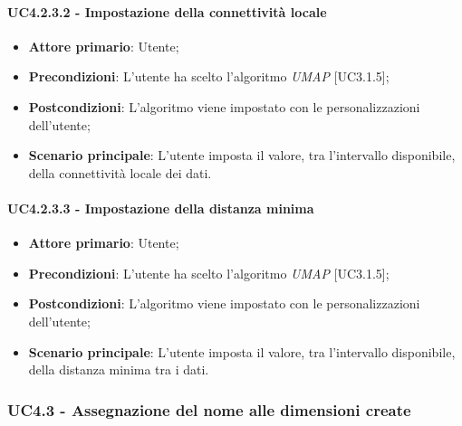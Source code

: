 \paragraph{UC4.2.3.2 - Impostazione della connettività locale}
\begin{itemize}
	\item \textbf{Attore primario}: Utente;
	
	\item \textbf{Precondizioni}: L'utente ha scelto l'algoritmo \textit{UMAP} [UC3.1.5];
	
	\item \textbf{Postcondizioni}: L'algoritmo viene impostato con le personalizzazioni dell'utente;
	
	\item \textbf{Scenario principale}: L'utente imposta il valore, tra l'intervallo disponibile, della connettività locale dei dati.

\end{itemize}

\paragraph{UC4.2.3.3 - Impostazione della distanza minima}
\begin{itemize}
	\item \textbf{Attore primario}: Utente;
	
	\item \textbf{Precondizioni}: L'utente ha scelto l'algoritmo \textit{UMAP} [UC3.1.5];
	
	\item \textbf{Postcondizioni}: L'algoritmo viene impostato con le personalizzazioni dell'utente;
	
	\item \textbf{Scenario principale}: L'utente imposta il valore, tra l'intervallo disponibile, della distanza minima tra i dati.

\end{itemize}

\subsubsection{UC4.3 - Assegnazione del nome alle dimensioni create}

